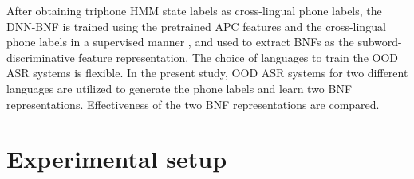 \documentclass[a4paper]{article}
\begin{document}
After obtaining triphone HMM state labels  as cross-lingual phone labels, the DNN-BNF  is trained using the pretrained APC features and the cross-lingual phone labels in a supervised manner \cite{grezl2007probabilistic}, and used to  extract BNFs   as the subword-discriminative feature representation. 
The choice of languages to train the OOD ASR systems is flexible. In the present study, OOD ASR systems for two different languages are utilized to generate the phone labels 
and learn two BNF representations. 
Effectiveness of  the two  BNF representations  are compared.%


\section{Experimental setup}
\end{document}
